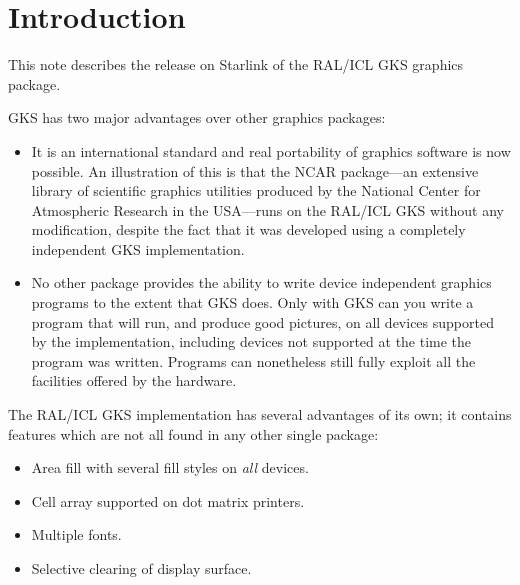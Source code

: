 \documentclass[11pt]{article}
\newcommand{\stardocinitials}  {SUN}
\newcommand{\stardocnumber}    {83.13}
\newcommand{\stardocname}{\stardocinitials /\stardocnumber}
\newenvironment{latexonly}{}{}
\newcommand{\latexonlytoc}[0]{\tableofcontents}
\renewcommand{\thepage}{\roman{page}}
\begin{document}
\renewcommand{\thepage}{\arabic{page}}
\setcounter{page}{1}

\section{Introduction}
This note describes the release on Starlink of the RAL/ICL GKS graphics
package.

GKS has two major advantages over other graphics packages:
\begin{itemize}

\item It is an international standard and real portability of graphics software
is now possible. An illustration of this is that the NCAR
package---an extensive library of scientific graphics utilities produced by the
National Center for Atmospheric Research in the USA---runs on the RAL/ICL GKS
without any modification, despite the fact that it was developed using a
completely independent GKS implementation.

\item No other package provides the ability to write device independent graphics
programs to the extent that GKS does.
Only with GKS can you write a program that will run, and produce good pictures,
on all devices supported by the implementation, including devices not supported
at the time the program was written.
Programs can nonetheless still fully exploit all the facilities offered by the
hardware.
\end{itemize}
The RAL/ICL GKS implementation has several advantages of its own;
it contains features which are not all found in any other single package:
\begin{itemize}
\item Area fill with several fill styles on {\em all\/} devices.
\item Cell array supported on dot matrix printers.
\item Multiple fonts.
\item Selective clearing of display surface.
\end{itemize}
\end{document}
